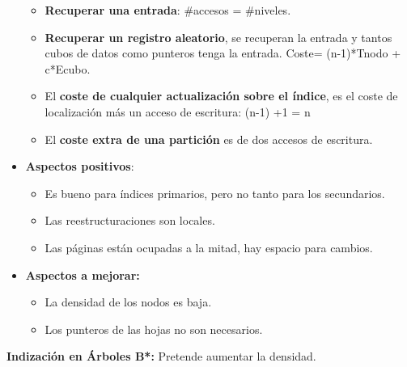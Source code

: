\documentclass[12pt, twoside, openright]{report} %
\begin{document}
\begin{itemize}
    \begin{itemize}
    \item \textbf{Recuperar una entrada}: \#accesos = \#niveles.
      
    \item \textbf{Recuperar un registro aleatorio}, se recuperan la entrada
      y tantos cubos de datos como punteros tenga la entrada. Coste=
      (n-1)*Tnodo + c*Ecubo.
      
    \item El \textbf{coste de cualquier actualización sobre el índice}, es
      el coste de localización más un acceso de escritura: (n-1) +1 = n
      
    \item El \textbf{coste extra de una partición} es de dos accesos de
      escritura.
      
    \end{itemize}
  \item \textbf{Aspectos positivos}:
    

    \begin{itemize}
    \item Es bueno para índices primarios, pero no tanto para los
      secundarios.
      
    \item Las reestructuraciones son locales.
      
    \item Las páginas están ocupadas a la mitad, hay espacio para cambios.
      
    \end{itemize}
  \item \textbf{Aspectos a mejorar:}
    

    \begin{itemize}
    \item La densidad de los nodos es baja.
      
    \item Los punteros de las hojas no son necesarios.
      
    \end{itemize}
  \end{itemize}

  
  \textbf{Indización en Árboles B*:} Pretende aumentar la densidad.
  
\end{document}
